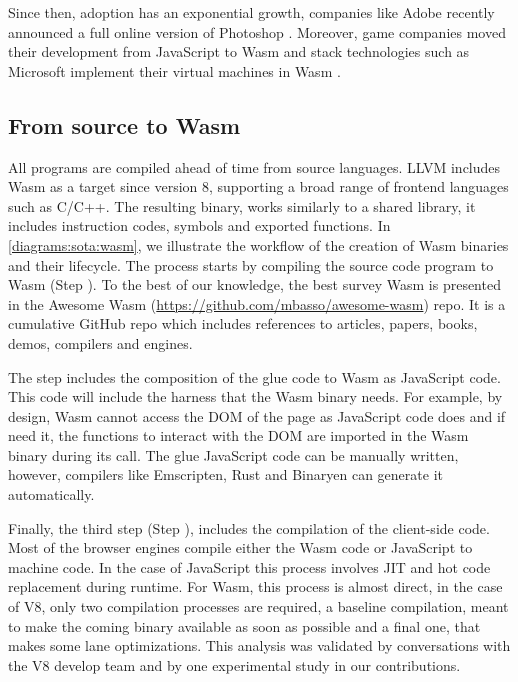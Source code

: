 Since then, \wasm adoption has an exponential growth, companies like Adobe recently announced a full online version of Photoshop \citationneeded. Moreover, game companies moved their development from JavaScript to Wasm \citationneeded and stack technologies such as Microsoft implement their virtual machines in Wasm \citationneeded.


\subsection*{From source to Wasm}

All \wasm programs are compiled ahead of time from source languages. LLVM includes Wasm as a target since version 8, supporting a broad range of frontend languages such as C/C++. The resulting binary, works similarly to a shared library, it includes instruction codes, symbols and exported functions. In \autoref{diagrams:sota:wasm}, we illustrate the workflow of the creation of Wasm binaries and their lifecycle. The process starts by compiling the source code program to Wasm (Step ). To the best of our knowledge, the best survey Wasm is presented in the Awesome Wasm (\url{https://github.com/mbasso/awesome-wasm}) repo. It is a cumulative GitHub repo which includes references to articles, papers, books, demos, compilers and engines. 

The step  includes the composition of the glue code to Wasm as JavaScript code. This code will include the harness that the Wasm binary needs. For example, by design, Wasm cannot access the DOM of the page as JavaScript code does and if need it, the functions to interact with the DOM are imported in the Wasm binary during its call. The glue JavaScript code can be manually written, however, compilers like Emscripten, Rust and Binaryen can generate it automatically.

Finally, the third step (Step ), includes the compilation of the client-side code. Most of the browser engines compile either the Wasm code or JavaScript to machine code. In the case of JavaScript this process involves JIT and hot code replacement during runtime. For Wasm, this process is almost direct, in the case of V8, only two compilation processes are required, a baseline compilation, meant to make the coming binary available as soon as possible and a final one, that makes some lane optimizations. This analysis was validated by conversations with the V8 develop team and by one experimental study in our contributions.  

